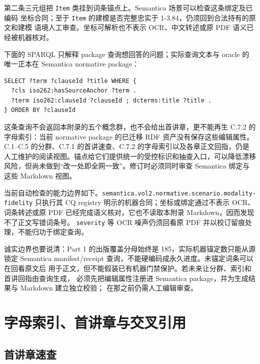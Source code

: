 第二条三元组把 \nolinkurl{Item} 类挂到词条锚点上。Semantica 场景可以检查这条绑定及已编码
坐标合同；至于 \nolinkurl{Item} 的建模是否完整忠实于 1-3.84，仍须回到合法持有的原文和建模
语境人工审查。坐标可解析也不表示 OCR、中文转述或原 PDF 语义已经被机器核对。

下面的 SPARQL 只解释 package 查询想回答的问题；实际查询文本与 oracle 的唯一正本在
Semantica normative package：

\nopagebreak[4]
\begin{codebox}
\begin{Verbatim}[fontsize=\small,breaklines=true,breakanywhere=true,breaksymbolleft={},breaksymbolright={}]
SELECT ?term ?clauseId ?title WHERE {
  ?cls iso262:hasSourceAnchor ?term .
  ?term iso262:clauseId ?clauseId ; dcterms:title ?title .
} ORDER BY ?clauseId
\end{Verbatim}
\end{codebox}

这条查询不会返回本附录的五个概念群，也不会给出首讲章，更不能再生 C.7.2 的字母索引：当前 normative package 的已迁移 RDF 资产没有保存这些编辑属性。C.1–C.5 的分群、C.7.1 的首讲速查、C.7.2 的字母索引以及各章正文回指，仍是人工维护的阅读视图。锚点给它们提供统一的受控标识和抽查入口，可以降低漂移风险，但尚未做到“改一处即全网一致”。修订时必须同时审查 Semantica 绑定与这些 Markdown 视图。

当前自动检查的能力边界如下。\nolinkurl{semantica.vol2.normative.scenario.modality-fidelity}
只执行其 CQ registry 明示的机器合同；坐标或绑定通过不表示 OCR、词条转述或原 PDF
已经完成语义核对，它也不读取本附录 Markdown，因而发现不了正文写错词条号。
\nolinkurl{severity} 等 OCR 噪声仍须回看原 PDF 并以校订留痕处理，不能归功于绑定查询。

诚实边界也要说清：Part 1 的出版覆盖分母始终是 185，实际机器锚定数只能从源锁定
Semantica manifest/receipt 查询，不能硬编码成永久进度。未锚定词条可以在回看原文后
用于正文，但不能假装已有机器门禁保护。若未来让分群、索引和首讲回指由查询生成，
必须先把编辑属性注册进 Semantica package，并为生成结果与 Markdown 建立独立校验；
在那之前仍需人工编辑审查。


\section{字母索引、首讲章与交叉引用}

\subsection{首讲章速查}

